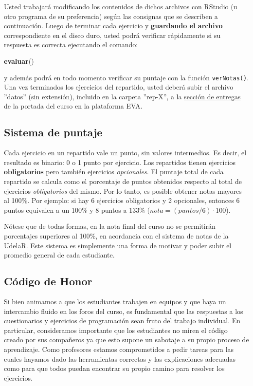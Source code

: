 \documentclass[]{article}
\newenvironment{Shaded}{}{}
\newcommand{\KeywordTok}[1]{\textcolor[rgb]{0.00,0.44,0.13}{\textbf{{#1}}}}
\newcommand{\NormalTok}[1]{{#1}}
\begin{document}
Usted trabajará modificando los contenidos de dichos archivos con
RStudio (u otro programa de su preferencia) según las consignas que se
describen a continuación. Luego de terminar cada ejercicio y
\textbf{guardando el archivo} correspondiente en el disco duro, usted
podrá verificar rápidamente si su respuesta es correcta ejecutando el
comando:

\begin{Shaded}
\begin{Highlighting}[]
\KeywordTok{evaluar}\NormalTok{()}
\end{Highlighting}
\end{Shaded}
y además podrá en todo momento verificar su puntaje con la función
\texttt{verNotas()}. Una vez terminados los ejercicios del repartido,
usted deberá subir el archivo ''datos'' (sin extensión), incluido en la
carpeta ''rep-X'', a la
\href{http://eva.universidad.edu.uy/mod/assignment/view.php?id=93616}{sección
de entregas} de la portada del curso en la plataforma EVA.

\subsection{Sistema de puntaje}

Cada ejercicio en un repartido vale un punto, sin valores intermedios.
Es decir, el resultado es binario: 0 o 1 punto por ejercicio. Los
repartidos tienen ejercicios \textbf{obligatorios} pero también
ejercicios \emph{opcionales}. El puntaje total de cada repartido se
calcula como el porcentaje de puntos obtenidos respecto al total de
ejercicios \emph{obligatorios} del mismo. Por lo tanto, es posible
obtener notas mayores al 100\%. Por ejemplo: si hay 6 ejercicios
obligatorios y 2 opcionales, entonces 6 puntos equivalen a un 100\% y 8
puntos a 133\% ($nota = (puntos / 6) \cdot 100$).

Nótese que de todas formas, en la nota final del curso no se permitirán
porcentajes superiores al 100\%, en acordancia con el sistema de notas
de la UdelaR. Este sistema es simplemente una forma de motivar y poder
subir el promedio general de cada estudiante.

\subsection{Código de Honor}

Si bien animamos a que los estudiantes trabajen en equipos y que haya un
intercambio fluido en los foros del curso, es fundamental que las
respuestas a los cuestionarios y ejercicios de programación sean fruto
del trabajo individual. En particular, consideramos importante que los
estudiantes no miren el código creado por sus compañeros ya que esto
supone un sabotaje a su propio proceso de aprendizaje. Como profesores
estamos comprometidos a pedir tareas para las cuales hayamos dado las
herramientas correctas y las explicaciones adecuadas como para que todos
puedan encontrar su propio camino para resolver los ejercicios.
\end{document}
